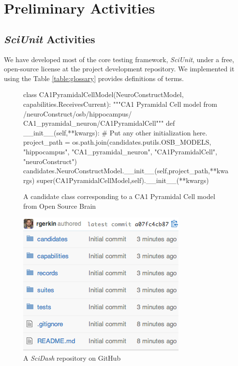 \documentclass[11pt,letterpaper]{article}
\begin{document}
\section{Preliminary Activities}

\subsection{\textit{SciUnit} Activities} We have developed most of the core testing framework, \textit{SciUnit}, under a free, open-source license at the project development repository\cite{sciunit_url}.  We implemented it using the   Table \ref{table:glossary} provides definitions of terms.  

\begin{figure}
\begin{python}
class CA1PyramidalCellModel(NeuroConstructModel,
				            capabilities.ReceivesCurrent):
	"""CA1 Pyramidal Cell model from /neuroConstruct/osb/hippocampus/
	CA1_pyramidal_neuron/CA1PyramidalCell"""
	def __init__(self,**kwargs):
		# Put any other initialization here.
		project_path = os.path.join(candidates.putils.OSB_MODELS,
									"hippocampus",
									"CA1_pyramidal_neuron",
									"CA1PyramidalCell",
									"neuroConstruct")
		candidates.NeuroConstructModel.__init__(self,project_path,**kwargs)
		super(CA1PyramidalCellModel,self).__init__(**kwargs)
\end{python}
\caption{A candidate class corresponding to a CA1 Pyramidal Cell model from Open Source Brain}
\label{fig:ca1_model}
\end{figure}

\begin{figure}
\includegraphics[scale=0.7]{scidash_github.png}
\caption{A \textit{SciDash} repository on GitHub}
\label{fig:scidash_repo}
\end{figure}
\leavevmode
{} 
\end{document}
